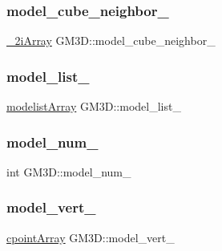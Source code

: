 \mbox{\label{class_g_m3_d_a4ba9a8b512cc82c73d9d18b65da8356b}} 
\subsubsection{\texorpdfstring{model\_cube\_neighbor\_}{model\_cube\_neighbor\_}}
{\footnotesize\ttfamily \mbox{\hyperlink{head__func_8h_ae1068d54a7271903a9efdcfac392891c}{\+\_\+2i\+Array}} G\+M3\+D\+::model\+\_\+cube\+\_\+neighbor\+\_\+\hspace{0.3cm}{\ttfamily [private]}}

\mbox{\label{class_g_m3_d_a229472281d8b8dd779b70842c44fff34}} 
\subsubsection{\texorpdfstring{model\_list\_}{model\_list\_}}
{\footnotesize\ttfamily \mbox{\hyperlink{head__func_8h_a67c2c11cfcc1333d195a0c79af9e6dfc}{modelist\+Array}} G\+M3\+D\+::model\+\_\+list\+\_\+\hspace{0.3cm}{\ttfamily [private]}}

\mbox{\label{class_g_m3_d_a005361a133eeedffc2d8b2e5b2016a4c}} 
\subsubsection{\texorpdfstring{model\_num\_}{model\_num\_}}
{\footnotesize\ttfamily int G\+M3\+D\+::model\+\_\+num\+\_\+\hspace{0.3cm}{\ttfamily [private]}}

\mbox{\label{class_g_m3_d_ae15aa6e3b449916c3195490a4627ae02}} 
\subsubsection{\texorpdfstring{model\_vert\_}{model\_vert\_}}
{\footnotesize\ttfamily \mbox{\hyperlink{head__func_8h_aa7b92de3a34382fdc6a258a2368eb513}{cpoint\+Array}} G\+M3\+D\+::model\+\_\+vert\+\_\+\hspace{0.3cm}{\ttfamily [private]}}

